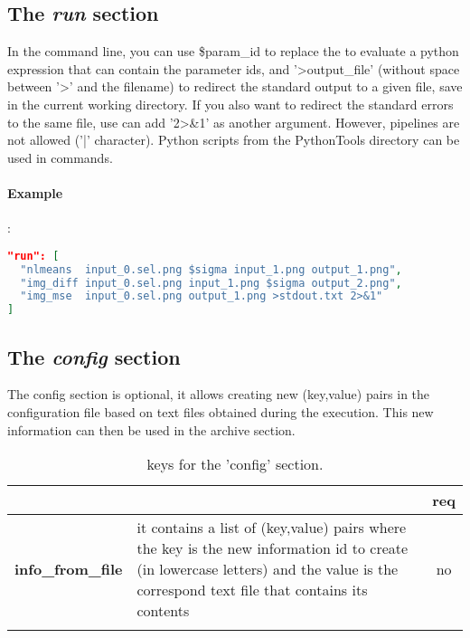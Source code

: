 \subsection{The \emph{run} section}

In the command line, you can use \$param\_id to replace the to evaluate a 
python expression that can contain the parameter ids,
and '\textgreater output\_file' (without space between '\textgreater' and the 
filename) to redirect the standard output to a given file, save in the current 
working directory. 
If you also want to redirect the standard errors to the same file, use can add 
'2\textgreater\&1' as another argument. However, pipelines are not allowed 
('|' character).
Python scripts from the PythonTools directory can be used in commands.

\paragraph{Example}:\\
\begin{lstlisting}[language=json,firstnumber=1]
"run": [
  "nlmeans  input_0.sel.png $sigma input_1.png output_1.png",
  "img_diff input_0.sel.png input_1.png $sigma output_2.png",
  "img_mse  input_0.sel.png output_1.png >stdout.txt 2>&1"
]
\end{lstlisting}

\subsection{The \emph{config} section}

The config section is optional, it allows creating new (key,value) pairs in the 
configuration file based on text files obtained during the execution. This 
new information can then be used in the archive section.

\begin{longtable}{|>{\bf}L{\linewidth}|L{\linewidth}|c|}
\hline
{}     &  & {\bf req} \tabularnewline 
\hline \hline
 info\_from\_file    & it contains a list of (key,value) pairs where the key is
            the new information id to create (in lowercase letters) and the
            value is the correspond text file that contains its contents & no \\ \hline
\caption{keys for the 'config' section.}
\end{longtable}

